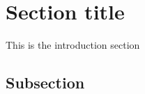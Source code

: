 \section{Section title}\label{Section label}
This is the introduction section
\subsection{Subsection}\label{subsection}